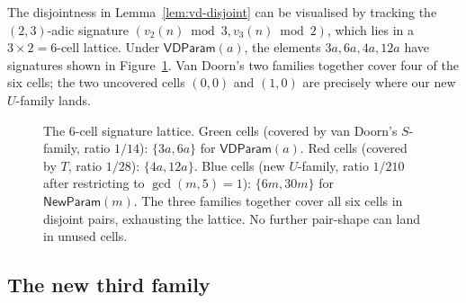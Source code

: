 \documentclass[11pt]{amsart}
\theoremstyle{plain}
\theoremstyle{definition}
\newcommand{\vdp}{\mathsf{VDParam}}
\newcommand{\np}{\mathsf{NewParam}}
\begin{document}
The disjointness in Lemma~\ref{lem:vd-disjoint} can be visualised by tracking the $(2, 3)$-adic signature $(v_2(n) \bmod 3, v_3(n) \bmod 2)$, which lies in a $3 \times 2 = 6$-cell lattice. Under $\vdp(a)$, the elements $3a, 6a, 4a, 12a$ have signatures shown in Figure~\ref{fig:vd-cells}. Van Doorn's two families together cover four of the six cells; the two uncovered cells $(0, 0)$ and $(1, 0)$ are precisely where our new $U$-family lands.

\begin{figure}[h!]
\centering
{}
\caption{The $6$-cell signature lattice. Green cells (covered by van Doorn's $S$-family, ratio $1/14$): $\{3a, 6a\}$ for $\vdp(a)$. Red cells (covered by $T$, ratio $1/28$): $\{4a, 12a\}$. Blue cells (new $U$-family, ratio $1/210$ after restricting to $\gcd(m, 5) = 1$): $\{6m, 30m\}$ for $\np(m)$. The three families together cover all six cells in disjoint pairs, exhausting the lattice. No further pair-shape can land in unused cells.}
\label{fig:vd-cells}
\end{figure}

\subsection{The new third family}
\end{document}
